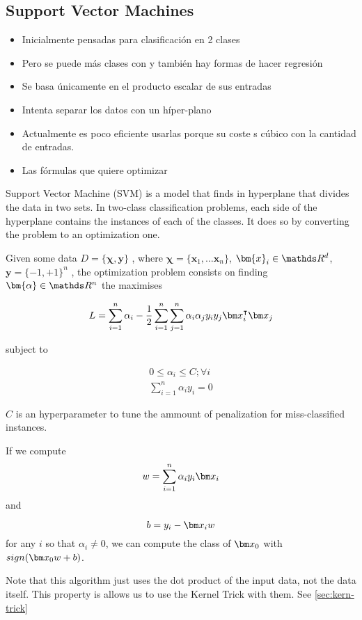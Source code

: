   \subsection{Support Vector Machines}
  \begin{note}
    \begin{itemize}
      \item Inicialmente pensadas para clasificación en 2 clases
      \item Pero se puede más clases con  y también hay
      formas de hacer regresión
      \item Se basa únicamente en el producto escalar de sus entradas
      \item Intenta separar los datos con un híper-plano
      \item Actualmente es poco eficiente usarlas porque su coste s cúbico
      con la cantidad de entradas.
      \item Las fórmulas que quiere optimizar
    \end{itemize}
  \end{note}

  \begin{pre-delivery}
    Support Vector Machine (SVM) is a model that finds in hyperplane that
    divides the data in two sets. In two-class classification problems, each
    side of the hyperplane contains the instances of each of the classes.
    It does so by converting the problem to an optimization one.

    Given some data
    $D = \{\bm{\chi}, \bm{y}\}$
    , where
    $\bm{\chi} = \{\bm{x}_1, \ldots \bm{x}_n\}$, $\bm{x}_i \in \reals^d$, $\bm{y} = \{-1, +1\}^n$
    , the optimization problem consists on finding $\bm{\alpha} \in \reals^n$
    the maximises

\begin{equation}
  L = \sum_{i = 1}^n\alpha_i -\frac{1}{2}\sum_{i = 1}^n\sum_{j = 1}^n\alpha_i\alpha_jy_iy_j\vx_i^\transp\vx_j
\end{equation}

subject to

\begin{align}
  0 \leq \alpha_i \leq C; \forall i\\
  \sum_{i = 1}^n \alpha_iy_i = 0
\end{align}

$C$ is an hyperparameter to tune the ammount of penalization for miss-classified
instances.

If we compute
\begin{equation}
  w = \sum_{i = 1}^n\alpha_iy_i\vx_i
\end{equation}
and

\begin{equation}
  b = y_i - \vx_iw
\end{equation}
for any $i$ so that $\alpha_i \neq 0$, we can compute the class of $\vx_0$ with
$sign(\vx_0w + b)$.

Note that this algorithm just uses the dot product of the input data, not the
data itself. This property is allows us to use the Kernel Trick with them.
See \ref{sec:kern-trick}

\end{pre-delivery}


